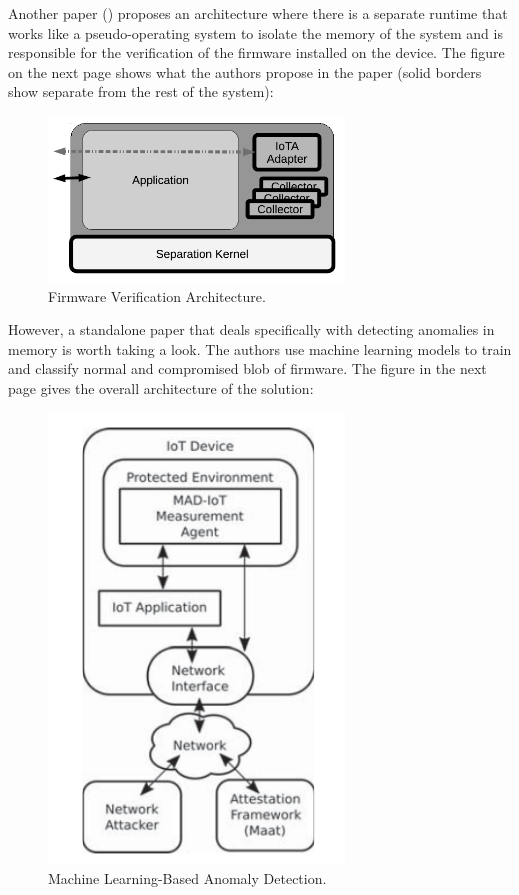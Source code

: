 \documentclass{article}
\begin{document}
Another paper (\cite{verification}) proposes an architecture where there is a separate runtime that works like a pseudo-operating system to isolate the memory of the system and is responsible for the verification of the firmware installed on the device. The figure on the next page shows what the authors propose in the paper (solid borders show separate from the rest of the system):
\begin{figure}[H]
    \centering
    \includegraphics[width=0.7\textwidth]{verification01.png}
    \caption{Firmware Verification Architecture.\cite{verification}}
\end{figure}

However, a standalone paper that deals specifically with detecting anomalies in memory is worth taking a look. The authors use machine learning models to train and classify normal and compromised blob of firmware. The figure in the next page gives the overall architecture of the solution:
\begin{figure}[H]
    \centering
    \includegraphics[width=0.7\textwidth]{mad01.png}
    \caption{Machine Learning-Based Anomaly Detection.\cite{mad}}
\end{figure}
\end{document}
